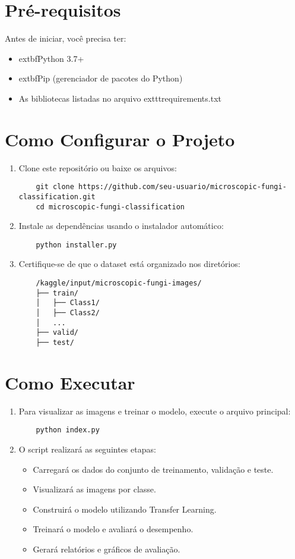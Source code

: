 \documentclass{article}
\begin{document}
\section{Pr\'e-requisitos}
Antes de iniciar, voc\^e precisa ter:
\begin{itemize}
    \item 	extbf{Python 3.7+}
    \item 	extbf{Pip} (gerenciador de pacotes do Python)
    \item As bibliotecas listadas no arquivo 	exttt{requirements.txt}
\end{itemize}

\section{Como Configurar o Projeto}
\begin{enumerate}
    \item Clone este reposit\'orio ou baixe os arquivos:
    \begin{verbatim}
    git clone https://github.com/seu-usuario/microscopic-fungi-classification.git
    cd microscopic-fungi-classification
    \end{verbatim}
    \item Instale as depend\^encias usando o instalador autom\'atico:
    \begin{verbatim}
    python installer.py
    \end{verbatim}
    \item Certifique-se de que o dataset est\'a organizado nos diret\'orios:
    \begin{verbatim}
    /kaggle/input/microscopic-fungi-images/
    ├── train/
    │   ├── Class1/
    │   ├── Class2/
    │   ...
    ├── valid/
    ├── test/
    \end{verbatim}
\end{enumerate}

\section{Como Executar}
\begin{enumerate}
    \item Para visualizar as imagens e treinar o modelo, execute o arquivo principal:
    \begin{verbatim}
    python index.py
    \end{verbatim}
    \item O script realizar\'a as seguintes etapas:
    \begin{itemize}
        \item Carregar\'a os dados do conjunto de treinamento, valida\c{c}\~ao e teste.
        \item Visualizar\'a as imagens por classe.
        \item Construir\'a o modelo utilizando Transfer Learning.
        \item Treinar\'a o modelo e avaliar\'a o desempenho.
        \item Gerar\'a relat\'orios e gr\'aficos de avalia\c{c}\~ao.
    \end{itemize}
\end{enumerate}
\end{document}
